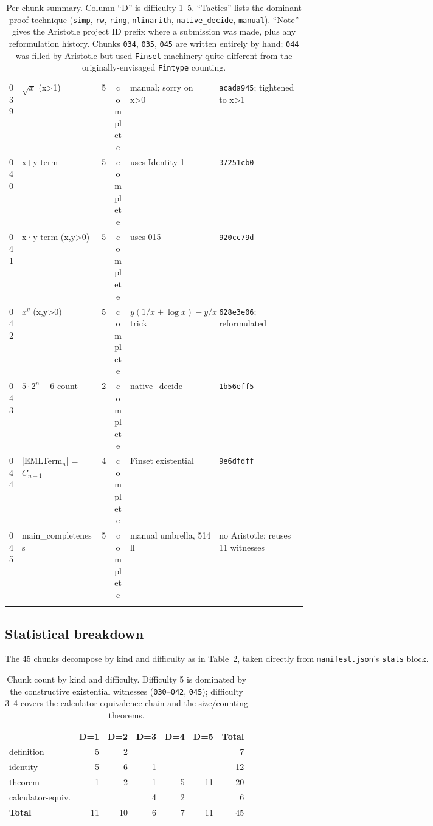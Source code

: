 \documentclass[11pt,a4paper]{article}
\theoremstyle{plain}
\theoremstyle{definition}
\begin{document}
{\begin{longtable}{@{}lp{0.27\linewidth}cclp{0.30\linewidth}@{}}
039 & $\sqrt{x}$ (x>1)  & 5 & complete & manual; sorry on x>0      & \texttt{acada945}; tightened to x>1 \\
040 & x+y term          & 5 & complete & uses Identity 1           & \texttt{37251cb0} \\
041 & x·y term (x,y>0)  & 5 & complete & uses 015                  & \texttt{920cc79d} \\
042 & $x^y$ (x,y>0)     & 5 & complete & $y(1/x+\log x)-y/x$ trick & \texttt{628e3e06}; reformulated \\
043 & $5\cdot 2^n-6$ count & 2 & complete & native\_decide         & \texttt{1b56eff5} \\
044 & |EMLTerm$_n$| = $C_{n-1}$ & 4 & complete & Finset existential& \texttt{9e6dfdff} \\
045 & main\_completeness & 5 & complete & manual umbrella, 514 ll  & no Aristotle; reuses 11 witnesses\\
\bottomrule
\caption{Per-chunk summary.  Column ``D'' is difficulty 1--5.
``Tactics'' lists the dominant proof technique (\texttt{simp},
\texttt{rw}, \texttt{ring}, \texttt{nlinarith}, \texttt{native\_decide},
\texttt{manual}).  ``Note'' gives the Aristotle project ID prefix where
a submission was made, plus any reformulation history.  Chunks
\texttt{034}, \texttt{035}, \texttt{045} are written entirely by hand;
\texttt{044} was filled by Aristotle but used \texttt{Finset} machinery
quite different from the originally-envisaged \texttt{Fintype}
counting.}
\label{tab:per-chunk}
\end{longtable}}

\subsection{Statistical breakdown}

The 45 chunks decompose by kind and difficulty as in
Table~\ref{tab:bystats}, taken directly from \texttt{manifest.json}'s
\texttt{stats} block.

\begin{table}[h]
\centering
\small
\begin{tabular}{@{}lrrrrrr@{}}
\toprule
 & \textbf{D=1} & \textbf{D=2} & \textbf{D=3} & \textbf{D=4} & \textbf{D=5} & \textbf{Total}\\
\midrule
definition         & 5 & 2 &   &   &   &  7\\
identity           & 5 & 6 & 1 &   &   & 12\\
theorem            & 1 & 2 & 1 & 5 & 11 & 20\\
calculator-equiv.  &   &   & 4 & 2 &   &  6\\
\midrule
\textbf{Total}     & 11 & 10 & 6 & 7 & 11 & 45\\
\bottomrule
\end{tabular}
\caption{Chunk count by kind and difficulty.  Difficulty 5 is dominated
by the constructive existential witnesses
(\texttt{030}--\texttt{042}, \texttt{045}); difficulty 3--4 covers the
calculator-equivalence chain and the size/counting theorems.}
\label{tab:bystats}
\end{table}
\end{document}
